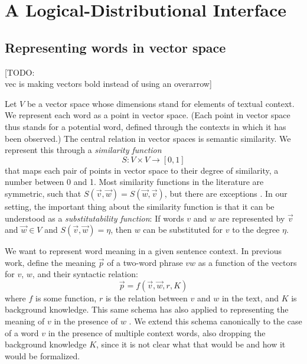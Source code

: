 \newcommand{\loglang}{\ensuremath{{\cal{L}}}\xspace}
\newcommand{\predsym}[1]{\ensuremath{{\cal{P}}_{#1}}\xspace}


\section{A Logical-Distributional Interface}
\label{sec:interface}

\subsection*{Representing words in vector space} 

[TODO: \\vec is making vectors bold instead of using an overarrow]

Let $V$ be a vector space whose dimensions stand for elements of  textual
context. We represent each word as a point in vector space. (Each point in
vector space thus stands for a potential word, defined through the contexts in
which it has been observed.) The central relation in vector spaces is semantic
similarity. We represent this through a \textit{similarity function} \[S: V
\times V \to [0,1] \] that maps each pair of points in vector space to their
degree of similarity, a number between 0 and 1. Most similarity functions in the
literature are symmetric, such that  $S(\vec v, \vec w) = S(\vec w, \vec v)$,
but there are exceptions \citep{kotlerman:nlej2010}. In our setting, the
important thing about the similarity function is that it can be understood as a
\emph{substitutability function}: If words $v$ and $w$ are represented by $\vec
v$ and $\vec w \in V$ and $S(\vec v, \vec w) = \eta$, then $w$ can be
substituted for $v$ to the degree $\eta$.


We want to represent word meaning in a given sentence context.
In previous work, \citet{MitchellLapata:08} define the meaning $\vec p$ of a
two-word phrase $vw$ as a function of the vectors for $v$, $w$, and their
syntactic relation:
\[\vec p = f(\vec v, \vec w, r, K) \] where $f$ is some function, $r$ is the
relation between $v$ and $w$ in the text, and $K$ is background knowledge. This
same schema has also applied to representing the meaning of $v$ in the presence
of $w$ \citep{erk:emnlp08}. We extend this schema canonically to the case of a
word $v$ in the presence of multiple context words, also dropping the background
knowledge $K$, since it is not clear what that would be and how it would be
formalized.

